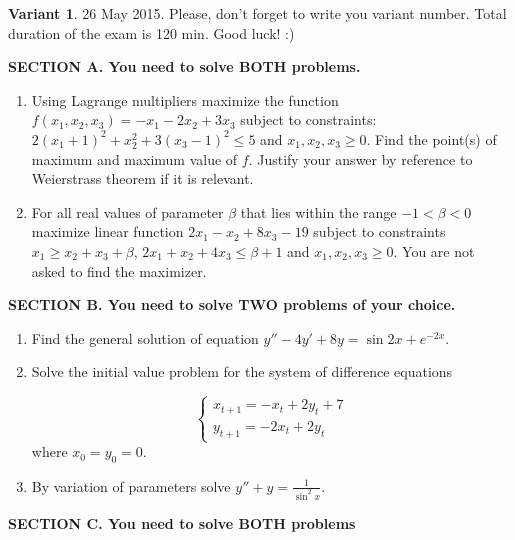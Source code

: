 \documentclass[12pt,a4paper]{article}
\begin{document}
\thispagestyle{empty}
\textbf{Variant 1}. 26 May 2015. Please, don't forget to write you variant number. Total duration of the exam is 120 min. Good luck! :) 

\vspace{0.6cm}

\textbf{SECTION A. You need to solve BOTH problems.}

\begin{enumerate}

\item Using Lagrange multipliers maximize  the function $f(x_1,x_2,x_3)=-x_1-2x_2+3x_3$ subject to constraints:   $2(x_1+1)^2+x_2^2+3(x_3-1)^2\leq 5$ and $x_1, x_2, x_3 \geq 0$. Find the point(s) of maximum and maximum value of $f$. Justify your answer by reference to Weierstrass theorem if it is relevant.

\item For all real values of parameter $\beta$ that lies within the range $-1<\beta<0$ maximize linear function $2x_1-x_2+8x_3-19$ subject to constraints  $x_1\geq x_2+x_3+\beta$,  $2x_1+x_2+4x_3\leq \beta+1$ and $x_1, x_2, x_3 \geq 0$. You are not asked to find the maximizer.

\end{enumerate}


\textbf{SECTION B. You need to solve TWO problems of your choice. }

\begin{enumerate}[resume]

\item Find the general solution of equation $y''-4y'+8y=\sin 2x + e^{-2x}$.

\item Solve the initial value problem for the system of difference equations

\[
\begin{cases}
x_{t+1}=-x_t+2y_t+7 \\
y_{t+1}=-2x_t+2y_t
\end{cases}
\]
where $x_0=y_0=0$.

\item By variation of parameters solve $y''+y=\frac{1}{\sin^2 x}$.

\end{enumerate}

\textbf{SECTION C. You need to solve BOTH problems }
\end{document}
